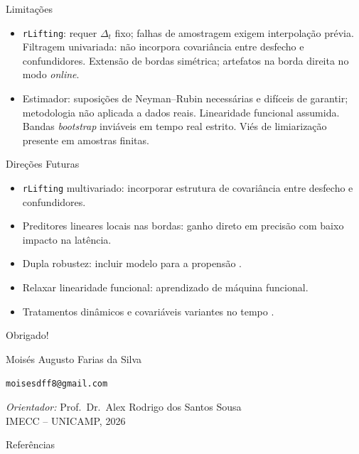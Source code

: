 \documentclass{beamer}
\begin{document}
\begin{frame}{Limitações}
\begin{itemize}
    \item \texttt{rLifting}: requer \(\Delta_t\) fixo; falhas de amostragem exigem interpolação prévia. Filtragem univariada: não incorpora covariância entre desfecho e confundidores. Extensão de bordas simétrica; artefatos na borda direita no modo \textit{online}.
    \item Estimador: suposições de Neyman--Rubin necessárias e difíceis de garantir; metodologia não aplicada a dados reais. Linearidade funcional assumida. Bandas \textit{bootstrap} inviáveis em tempo real estrito. Viés de limiarização presente em amostras finitas.
\end{itemize}
\end{frame}

\begin{frame}{Direções Futuras}
\begin{itemize}
    \item \texttt{rLifting} multivariado: incorporar estrutura de covariância entre desfecho e confundidores.
    \item Preditores lineares locais nas bordas: ganho direto em precisão com baixo impacto na latência.
    \item Dupla robustez: incluir modelo para a propensão \cite{testa_doubly-robust_2025}.
    \item Relaxar linearidade funcional: aprendizado de máquina funcional.
    \item Tratamentos dinâmicos e covariáveis variantes no tempo \cite{ying_causality_2024}.
\end{itemize}
\end{frame}

\begin{frame}{}
\centering
\vspace{1cm}
{\Huge \textcolor{vermelhoquaserosa}{Obrigado!}}

\vspace{1.2cm}
\large Moisés Augusto Farias da Silva

\vspace{0.3cm}
\normalsize \texttt{moisesdff8@gmail.com}

\vspace{0.8cm}
\normalsize
\textit{Orientador:} Prof.\ Dr.\ Alex Rodrigo dos Santos Sousa\\[0.2cm]
IMECC -- UNICAMP, 2026
\end{frame}

\begin{frame}[allowframebreaks]{Referências}
\tiny

\end{frame}
\end{document}

